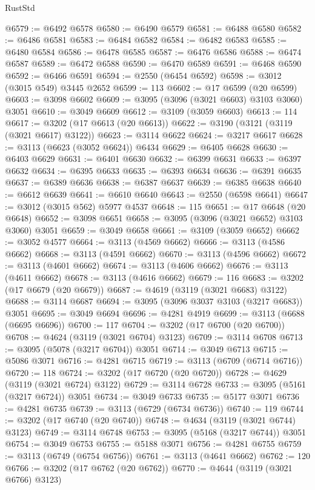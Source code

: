 \begin{lexlean}{RustStd}
\begin{coremodule}
{\begin{coremodule}
{{{{{{{{{{{{{{{{{{{{{{{{{{{{{{{{@6579 := @6492 @6578
@6580 := @6490 @6579
@6581 := @6488 @6580
@6582 := @6486 @6581
@6583 := @6484 @6582
@6584 := @6482 @6583
@6585 := @6480 @6584
@6586 := @6478 @6585
@6587 := @6476 @6586
@6588 := @6474 @6587
@6589 := @6472 @6588
@6590 := @6470 @6589
@6591 := @6468 @6590
@6592 := @6466 @6591
@6594 := @2550 (@6454 @6592)
@6598 := @3012 (@3015 @549) @3445 @2652
@6599 := 113
@6602 := @17 @6599 (@20 @6599)
@6603 := @3098 @6602
@6609 := @3095 (@3096 (@3021 @6603) @3103 @3060) @3051
@6610 := @3049 @6609
@6612 := @3109 (@3059 @6603)
@6613 := 114
@6617 := @3202 (@17 @6613 (@20 @6613))
@6622 := @3190 (@3121 (@3119 (@3021 @6617) @3122))
@6623 := @3114 @6622
@6624 := @3217 @6617
@6628 := @3113 (@6623 (@3052 @6624)) @6434
@6629 := @6405 @6628
@6630 := @6403 @6629
@6631 := @6401 @6630
@6632 := @6399 @6631
@6633 := @6397 @6632
@6634 := @6395 @6633
@6635 := @6393 @6634
@6636 := @6391 @6635
@6637 := @6389 @6636
@6638 := @6387 @6637
@6639 := @6385 @6638
@6640 := @6612 @6639
@6641 := @6610 @6640
@6643 := @2550 (@6598 @6641)
@6647 := @3012 (@3015 @562) @5977 @4537
@6648 := 115
@6651 := @17 @6648 (@20 @6648)
@6652 := @3098 @6651
@6658 := @3095 (@3096 (@3021 @6652) @3103 @3060) @3051
@6659 := @3049 @6658
@6661 := @3109 (@3059 @6652)
@6662 := @3052 @4577
@6664 := @3113 (@4569 @6662)
@6666 := @3113 (@4586 @6662)
@6668 := @3113 (@4591 @6662)
@6670 := @3113 (@4596 @6662)
@6672 := @3113 (@4601 @6662)
@6674 := @3113 (@4606 @6662)
@6676 := @3113 (@4611 @6662)
@6678 := @3113 (@4616 @6662)
@6679 := 116
@6683 := @3202 (@17 @6679 (@20 @6679))
@6687 := @4619 (@3119 (@3021 @6683) @3122)
@6688 := @3114 @6687
@6694 := @3095 (@3096 @3037 @3103 (@3217 @6683)) @3051
@6695 := @3049 @6694
@6696 := @4281 @4919
@6699 := @3113 (@6688 (@6695 @6696))
@6700 := 117
@6704 := @3202 (@17 @6700 (@20 @6700))
@6708 := @4624 (@3119 (@3021 @6704) @3123)
@6709 := @3114 @6708
@6713 := @3095 (@5078 (@3217 @6704)) @3051
@6714 := @3049 @6713
@6715 := @5086 @3071
@6716 := @4281 @6715
@6719 := @3113 (@6709 (@6714 @6716))
@6720 := 118
@6724 := @3202 (@17 @6720 (@20 @6720))
@6728 := @4629 (@3119 (@3021 @6724) @3122)
@6729 := @3114 @6728
@6733 := @3095 (@5161 (@3217 @6724)) @3051
@6734 := @3049 @6733
@6735 := @5177 @3071
@6736 := @4281 @6735
@6739 := @3113 (@6729 (@6734 @6736))
@6740 := 119
@6744 := @3202 (@17 @6740 (@20 @6740))
@6748 := @4634 (@3119 (@3021 @6744) @3123)
@6749 := @3114 @6748
@6753 := @3095 (@5168 (@3217 @6744)) @3051
@6754 := @3049 @6753
@6755 := @5188 @3071
@6756 := @4281 @6755
@6759 := @3113 (@6749 (@6754 @6756))
@6761 := @3113 (@4641 @6662)
@6762 := 120
@6766 := @3202 (@17 @6762 (@20 @6762))
@6770 := @4644 (@3119 (@3021 @6766) @3123)
}}}}}}}}}}}}}}}}}}}}}}}}}}}}}}}}
\end{coremodule}}
\end{coremodule}
\end{lexlean}
